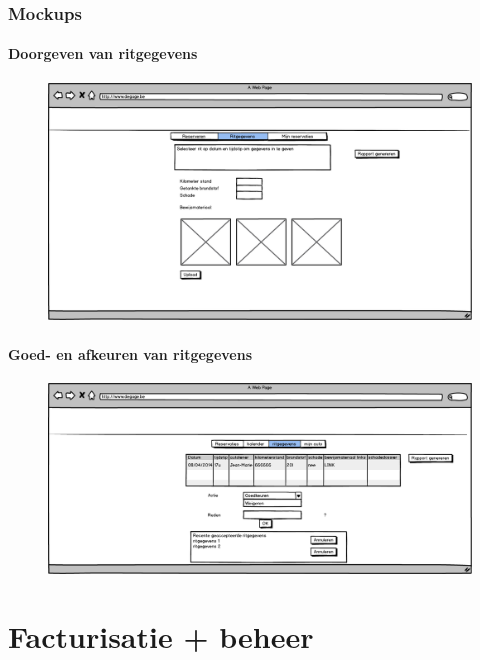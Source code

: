 \documentclass[11pt,a4paper,oneside]{article}
\begin{document}
\section{Mockups}
\subsection{Doorgeven van ritgegevens}
\begin{figure}[H]\includegraphics[width=\textwidth]{../../mockups/delen_ritgegevens.png}\end{figure}

\subsection{Goed- en afkeuren van ritgegevens}
\begin{figure}[H]\includegraphics[width=\textwidth]{../../mockups/autobeheer_ritgegevens.png}\end{figure}

\setcounter{section}{0}
\setcounter{subsection}{0}
\part{Facturisatie + beheer}
\end{document}

